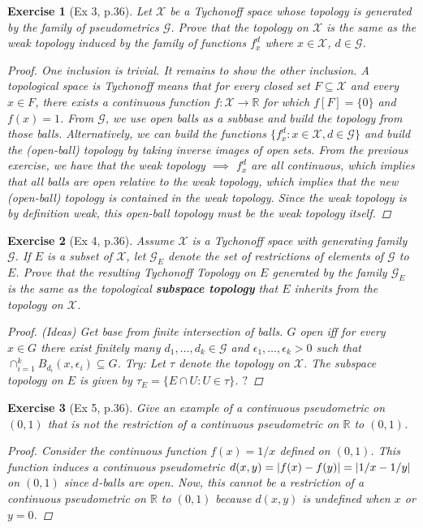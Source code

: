\documentclass[11pt]{article}
\newtheorem{exercise}{Exercise}
\newcommand{\R}{\mathbb{R}}
\newcommand{\X}{\mathcal{X}}
\begin{document}
\begin{exercise}[Ex 3, p.36]
	Let $\X$ be a Tychonoff space whose topology is generated by the family of pseudometrics $\mathcal{G}$. Prove that the topology on $\X$ is the same as the weak topology induced by the family of functions $f_x^d$ where $x\in \X$, $d\in \mathcal{G}$.
	\begin{proof}
		One inclusion is trivial. It remains to show the other inclusion. A topological space is Tychonoff means that for every closed set $F\subseteq \X$ and every $x\in F$, there exists a continuous function $f: \X \to \R$ for which $f[F] = \{ 0 \}$ and $f(x) = 1$. From $\mathcal{G}$, we use open balls as a subbase and build the topology from those balls. Alternatively, we can build the functions $\{ f^d_x : x\in \X, d\in \mathcal{G} \}$ and build the (open-ball) topology by taking inverse images of open sets. From the previous exercise, we have that the weak topology $\implies$ $f^d_x$ are all continuous, which implies that all balls are open relative to the weak topology, which implies that the new (open-ball) topology is contained in the weak topology. Since the weak topology is by definition \textit{weak}, this open-ball topology must be the weak topology itself. 
	\end{proof}
\end{exercise}

\begin{exercise}[{Ex 4, p.36}]
	Assume $\X$ is a Tychonoff space with generating family $\mathcal{G}$. If $E$ is a subset of $\X$, let $\mathcal{G}_E$ denote the set of restrictions of elements of $\mathcal{G}$ to $E$. Prove that the resulting Tychonoff Topology on $E$ generated by the family $\mathcal{G}_E$ is the same as the topological \textbf{subspace topology} that $E$ inherits from the topology on $\X$. 
	\begin{proof}
	 (Ideas) Get base from finite intersection of balls. $G$ open iff for every $x\in G$ there exist finitely many $d_1,\dots, d_k \in \mathcal{G}$ and $\epsilon_1,\dots, \epsilon_k > 0$ such that $\cap^k_{i=1}B_{d_i}(x,\epsilon_i) \subseteq G$. Try: Let $\tau$ denote the topology on $\X$. The subspace topology on $E$ is given by $\tau_E = \{E\cap U : U\in \tau \}$. $\boxed{?}$
	\end{proof}
\end{exercise}

\begin{exercise}[Ex 5, p.36]
	Give an example of a continuous pseudometric on $(0, 1)$ that is not the restriction of a continuous pseudometric on $\R$ to $(0, 1)$. 
	\begin{proof}
		Consider the continuous function $f(x) = 1/x$ defined on $(0,1)$. This function induces a continuous pseudometric $d(x,y) = \abs{f(x) - f(y)} = \abs{1/x - 1/y}$ on $(0,1)$ since $d$-balls are open. Now, this cannot be a restriction of a continuous pseudometric on $\R$ to $(0,1)$ because $d(x,y)$ is undefined when $x$ or $y=0$. 
	\end{proof}
\end{exercise}
\end{document}
